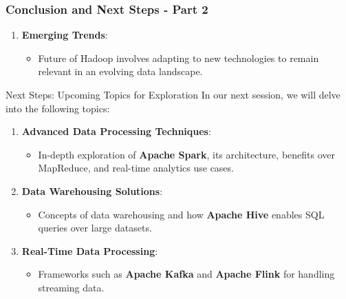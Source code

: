 \documentclass[aspectratio=169]{beamer}
\begin{document}
\begin{frame}[fragile]
    \frametitle{Conclusion and Next Steps - Part 2}
    
    \begin{enumerate}[resume]
        \item \textbf{Emerging Trends}:
        \begin{itemize}
            \item Future of Hadoop involves adapting to new technologies to remain relevant in an evolving data landscape.
        \end{itemize}
    \end{enumerate}

    \begin{block}{Next Steps: Upcoming Topics for Exploration}
    In our next session, we will delve into the following topics:
    \end{block}

    \begin{enumerate}
        \item \textbf{Advanced Data Processing Techniques}:
        \begin{itemize}
            \item In-depth exploration of \textbf{Apache Spark}, its architecture, benefits over MapReduce, and real-time analytics use cases.
        \end{itemize}

        \item \textbf{Data Warehousing Solutions}:
        \begin{itemize}
            \item Concepts of data warehousing and how \textbf{Apache Hive} enables SQL queries over large datasets.
        \end{itemize}

        \item \textbf{Real-Time Data Processing}:
        \begin{itemize}
            \item Frameworks such as \textbf{Apache Kafka} and \textbf{Apache Flink} for handling streaming data.
        \end{itemize}
    \end{enumerate}
\end{frame}
\end{document}
